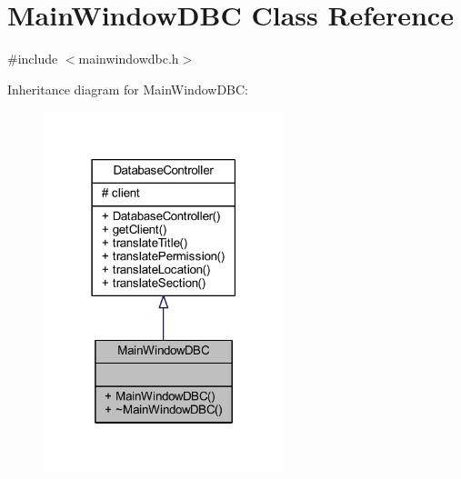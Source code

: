\hypertarget{class_main_window_d_b_c}{}\section{Main\+Window\+D\+B\+C Class Reference}
\label{class_main_window_d_b_c}


{\ttfamily \#include $<$mainwindowdbc.\+h$>$}



Inheritance diagram for Main\+Window\+D\+B\+C\+:
\nopagebreak
\begin{figure}[H]
\begin{center}
\leavevmode
\includegraphics[width=198pt]{class_main_window_d_b_c__inherit__graph}
\end{center}
\end{figure}


